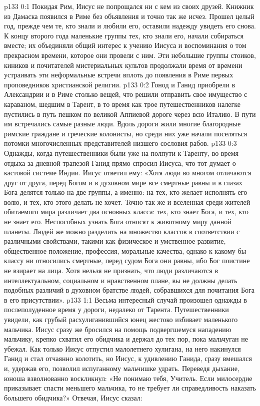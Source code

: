\author{Комиссия срединников}
\vs p133 0:1 Покидая Рим, Иисус не попрощался ни с кем из своих друзей. Книжник из Дамаска появился в Риме без объявления и точно так же исчез. Прошел целый год, прежде чем те, кто знали и любили его, оставили надежду увидеть его снова. К концу второго года маленькие группы тех, кто знали его, начали собираться вместе; их объединяли общий интерес к учению Иисуса и воспоминания о том прекрасном времени, которое они провели с ним. Эти небольшие группы стоиков, киников и почитателей мистериальных культов продолжали время от времени устраивать эти неформальные встречи вплоть до появления в Риме первых проповедников христианской религии.
\vs p133 0:2 \pc Гонод и Ганид приобрели в Александрии и в Риме столько вещей, что решили отправить свое имущество с караваном, шедшим в Тарент, в то время как трое путешественников налегке пустились в путь пешком по великой Аппиевой дороге через всю Италию. В пути им встречались самые разные люди. Вдоль дороги жили многие благородные римские граждане и греческие колонисты, но среди них уже начали поселяться потомки многочисленных представителей низшего сословия рабов.
\vs p133 0:3 Однажды, когда путешественники были уже на полпути к Таренту, во время отдыха за дневной трапезой Ганид прямо спросил Иисуса, что тот думает о кастовой системе Индии. Иисус ответил ему: «Хотя люди во многом отличаются друг от друга, перед Богом и в духовном мире все смертные равны и в глазах Бога делятся только на две группы, а именно: на тех, кто желает исполнять его волю, и тех, кто этого делать не хочет. Точно так же и вселенная среди жителей обитаемого мира различает два основных класса: тех, кто знает Бога, и тех, кто не знает его. Неспособных узнать Бога относят к животному миру данной планеты. Людей же можно разделить на множество классов в соответствии с различными свойствами, такими как физическое и умственное развитие, общественное положение, профессия, моральные качества, однако к какому бы классу ни относились смертные, перед судом Бога они равны, ибо Бог поистине не взирает на лица. Хотя нельзя не признать, что люди различаются в интеллектуальном, социальном и нравственном плане, вы не должны делать подобных различий в духовном братстве людей, собравшихся для почитания Бога в его присутствии».
\vs p133 1:1 Весьма интересный случай произошел однажды в послеполуденное время у дороги, недалеко от Тарента. Путешественники увидели, как грубый расхулиганившийся юнец жестоко избивает маленького мальчика. Иисус сразу же бросился на помощь подвергшемуся нападению мальчику, крепко схватил его обидчика и держал до тех пор, пока мальчуган не убежал. Как только Иисус отпустил малолетнего хулигана, на него накинулся Ганид и стал отчаянно колотить, но Иисус, к удивлению Ганида, сразу вмешался и, удержав его, позволил испуганному мальчишке удрать. Переведя дыхание, юноша взволнованно воскликнул: «Не понимаю тебя, Учитель. Если милосердие приказывает спасти меньшего мальчика, то не требует ли справедливость наказать большего обидчика?» Отвечая, Иисус сказал:
